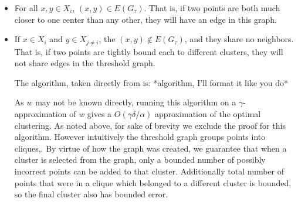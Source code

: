 \documentclass[paper=a4, fontsize=10.5pt]{scrartcl} %
\numberwithin{equation}{section} %
\numberwithin{figure}{section} %
\numberwithin{table}{section} %
\begin{document}
\begin{itemize}
\item For all $x, y \in X_i$, $(x,y) \in E(G_\tau)$. That is, if two points are both much closer to one center than any other, they will have an edge in this graph.

\item If $x \in X_i$ and $y \in X_{j \neq i}$, the $(x,y) \notin E(G_\tau)$, and they share no neighbors. That is, if two points are tightly bound each to different clusters, they will not share edges in the threshold graph. 

The algorithm, taken directly from \cite{firstpaper} is: *algorithm, I'll format it like you do*

As $w$ may not be known directly, running this algorithm on a $\gamma$-approximation of $w$ gives a $O(\gamma\delta/\alpha)$ approximation of the optimal clustering. As noted above, for sake of brevity we exclude the proof for this algorithm. However intuitively the threshold graph groups points into cliques,. By virtue of how the graph was created, we guarantee that when a cluster is selected from the graph, only a bounded number of possibly incorrect points can be added to that cluster. Additionally total number of points that were in a clique which belonged to a different cluster is bounded, so the final cluster also has bounded error. 

\end{itemize}
{}

\end{document}
